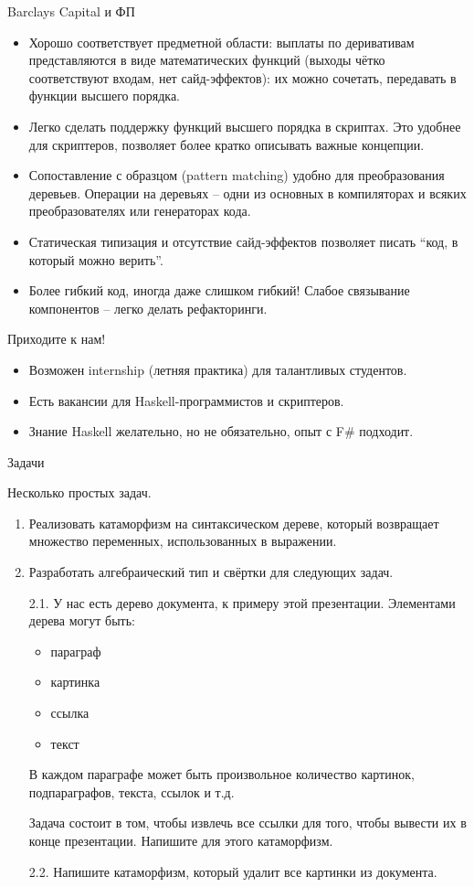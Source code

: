 \documentclass{beamer}
\begin{document}
\begin{frame}{Barclays Capital и ФП}
\begin{itemize}
\item
  Хорошо соответствует предметной области: выплаты по деривативам
  представляются в виде математических функций (выходы чётко
  соответствуют входам, нет сайд-эффектов): их можно сочетать,
  передавать в функции высшего порядка.
\item
  Легко сделать поддержку функций высшего порядка в скриптах. Это
  удобнее для скриптеров, позволяет более кратко описывать важные
  концепции.
\item
  Сопоставление с образцом (pattern matching) удобно для преобразования
  деревьев. Операции на деревьях -- одни из основных в компиляторах и
  всяких преобразователях или генераторах кода.
\item
  Статическая типизация и отсутствие сайд-эффектов позволяет писать
  ``код, в который можно верить''.
\item
  Более гибкий код, иногда даже слишком гибкий! Слабое связывание
  компонентов -- легко делать рефакторинги.
\end{itemize}
\end{frame}\begin{frame}{Приходите к нам!}

\begin{itemize}
\item
  Возможен internship (летняя практика) для талантливых студентов.
\item
  Есть вакансии для Haskell-программистов и скриптеров.
\item
  Знание Haskell желательно, но не обязательно, опыт с F\# подходит.
\end{itemize}
\end{frame}\begin{frame}{Задачи}

Несколько простых задач.

\begin{enumerate}[1.]
\item
  Реализовать катаморфизм на синтаксическом дереве, который возвращает
  множество переменных, использованных в выражении.
\item
  Разработать алгебраический тип и свёртки для следующих задач.

  2.1. У нас есть дерево документа, к примеру этой презентации.
  Элементами дерева могут быть:

  \begin{itemize}
  \item
    параграф
  \item
    картинка
  \item
    ссылка
  \item
    текст
  \end{itemize}
  В каждом параграфе может быть произвольное количество картинок,
  подпараграфов, текста, ссылок и т.д.

  Задача состоит в том, чтобы извлечь все ссылки для того, чтобы вывести
  их в конце презентации. Напишите для этого катаморфизм.

  2.2. Напишите катаморфизм, который удалит все картинки из документа.
\end{enumerate}
\end{frame}
\end{document}
